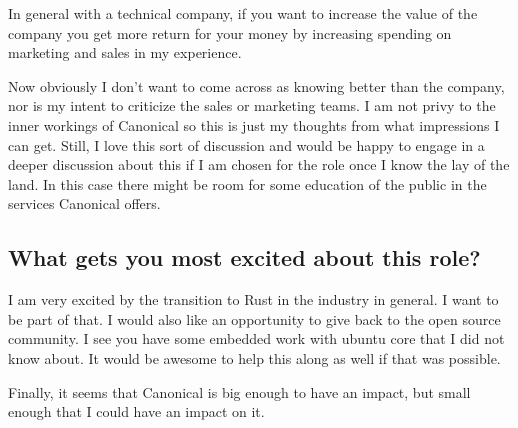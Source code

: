 \documentclass[letter,12pt]{article}
\begin{document}
In general with a technical company, if you want to increase the value of the company you get more return for your money by increasing spending on marketing and sales in my experience.

Now obviously I don't want to come across as knowing better than the company, nor is my intent to criticize the sales or marketing teams. I am not privy to the inner workings of Canonical so this is just my thoughts from what impressions I can get. Still, I love this sort of discussion and would be happy to engage in a deeper discussion about this if I am chosen for the role once I know the lay of the land. In this case there might be room for some education of the public in the services Canonical offers.

\subsection{What gets you most excited about this role?}
I am very excited by the transition to Rust in the industry in general. I want to be part of that. I would also like an opportunity to give back to the open source community. I see you have some embedded work with ubuntu core that I did not know about. It would be awesome to help this along as well if that was possible.

Finally, it seems that Canonical is big enough to have an impact, but small enough that I could have an impact on it.
\end{document}
